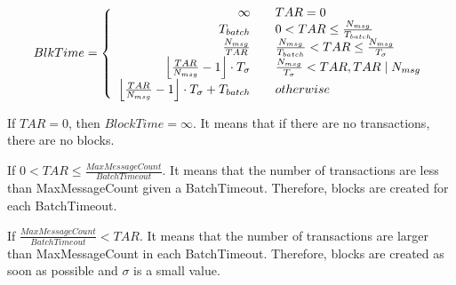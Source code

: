 \documentclass[10pt,journal,compsoc, twoside]{IEEEtran}
\begin{document}
\begin{equation}
	BlkTime=\left\{
	\begin{array}{rcl}
	\infty  & & {TAR=0}\\
	$$T_{batch}$$ & & $$0 < TAR \leq \frac{N_{msg}}{T_{batch}}$$\\
	\frac{N_{msg}}{TAR} && \frac{N_{msg}}{T_{batch}}<TAR\leq \frac{N_{msg}}{T_{\sigma}}\\
	$$\left \lfloor \frac{TAR}{N_{msg}}-1 \right \rfloor \cdot T_\sigma$$  & & $$\frac{N_{msg}}{T_{\sigma}}< TAR, TAR\mid N_{msg} $$\\
	\left \lfloor \frac{TAR}{N_{msg}}-1 \right \rfloor \cdot T_\sigma + T_{batch}  & & otherwise
	\end{array} \right.
\end{equation}


If $TAR=0$, then $BlockTime=\infty$. It means that if there are no transactions, there are no blocks.

If $0 < TAR \leq \frac{MaxMessageCount}{BatchTimeout}$. It means that the number of transactions are less than MaxMessageCount given a BatchTimeout. Therefore, blocks are created for each BatchTimeout.

If $\frac{MaxMessageCount}{BatchTimeout}< TAR$. It means that the number of transactions are larger than MaxMessageCount in each BatchTimeout. Therefore, blocks are created as soon as possible and $\sigma$ is a small value.
\end{document}
